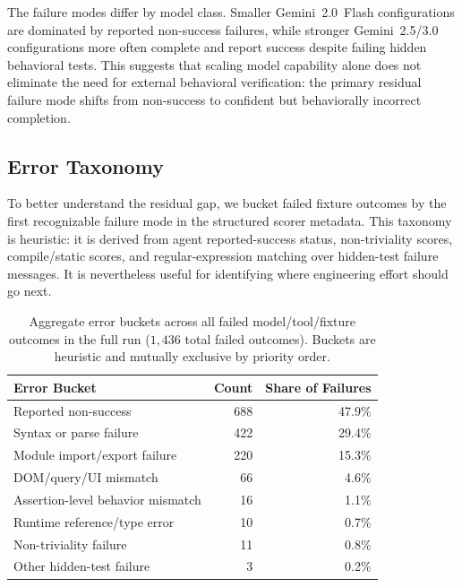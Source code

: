 \documentclass[11pt,letterpaper]{article}
\begin{document}
\noindent The failure modes differ by model class. Smaller Gemini~2.0~Flash configurations are dominated by reported non-success failures, while stronger Gemini~2.5/3.0 configurations more often complete and report success despite failing hidden behavioral tests. This suggests that scaling model capability alone does not eliminate the need for external behavioral verification: the primary residual failure mode shifts from non-success to confident but behaviorally incorrect completion.

\subsection{Error Taxonomy}

To better understand the residual gap, we bucket failed fixture outcomes by the first recognizable failure mode in the structured scorer metadata. This taxonomy is heuristic: it is derived from agent reported-success status, non-triviality scores, compile/static scores, and regular-expression matching over hidden-test failure messages. It is nevertheless useful for identifying where engineering effort should go next.

\begin{table}[ht]
\centering
\caption{Aggregate error buckets across all failed model/tool/fixture outcomes in the full run ($1{,}436$ total failed outcomes). Buckets are heuristic and mutually exclusive by priority order.}
\label{tab:error-taxonomy}
\small
\begin{tabular}{lrr}
\toprule
\textbf{Error Bucket} & \textbf{Count} & \textbf{Share of Failures} \\
\midrule
Reported non-success & 688 & 47.9\% \\
Syntax or parse failure & 422 & 29.4\% \\
Module import/export failure & 220 & 15.3\% \\
DOM/query/UI mismatch & 66 & 4.6\% \\
Assertion-level behavior mismatch & 16 & 1.1\% \\
Runtime reference/type error & 10 & 0.7\% \\
Non-triviality failure & 11 & 0.8\% \\
Other hidden-test failure & 3 & 0.2\% \\
\bottomrule
\end{tabular}
\end{table}
\end{document}
